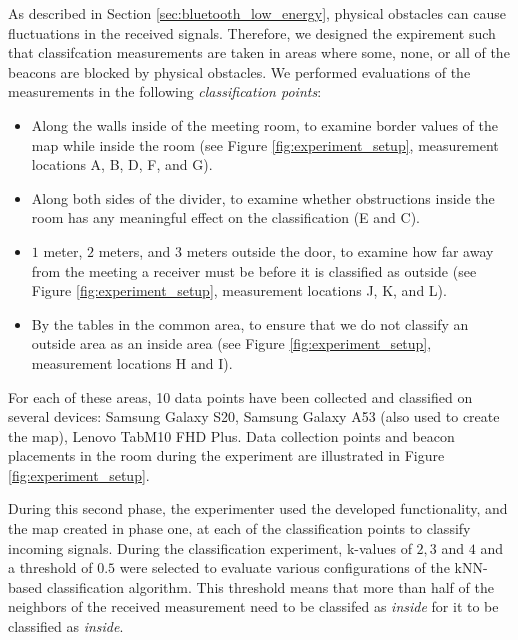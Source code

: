 As described in Section \ref{sec:bluetooth_low_energy}, physical obstacles can cause fluctuations in the received signals. 
Therefore, we designed the expirement such that classifcation measurements are taken in areas where some, none, or all of the beacons are blocked by physical obstacles. 
We performed evaluations of the measurements in the following \textit{classification points}:
\begin{itemize}
    \item Along the walls inside of the meeting room, to examine border values of the map while inside the room (see Figure \ref{fig:experiment_setup}, measurement locations A, B, D, F, and G).
    \item Along both sides of the divider, to examine whether obstructions inside the room has any meaningful effect on the classification (E and C).
    \item $1$ meter, $2$ meters, and $3$ meters outside the door, to examine how far away from the meeting a receiver must be before it is classified as outside (see Figure \ref{fig:experiment_setup}, measurement locations J, K, and L).
    \item By the tables in the common area, to ensure that we do not classify an outside area as an inside area (see Figure \ref{fig:experiment_setup}, measurement locations H and I).
\end{itemize}
For each of these areas, 10 data points have been collected and classified on several devices: Samsung Galaxy S20, Samsung Galaxy A53 (also used to create the map), Lenovo TabM10 FHD Plus.
Data collection points and beacon placements in the room during the experiment are illustrated in Figure \ref{fig:experiment_setup}. 

During this second phase, the experimenter used the developed functionality, and the map created in phase one, at each of the classification points to classify incoming signals.
During the classification experiment, k-values of $2,3$ and $4$ and a threshold of $0.5$ were selected to evaluate various configurations of the kNN-based classification algorithm.
This threshold means that more than half of the neighbors of the received measurement need to be classifed as \textit{inside} for it to be classified as \textit{inside}.

